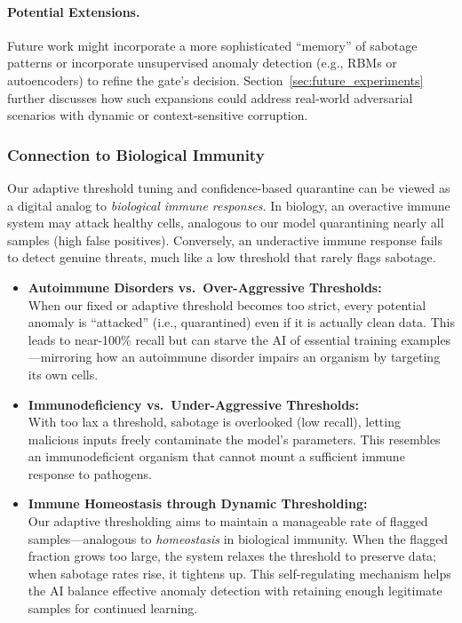 \documentclass[12pt]{article}
\begin{document}
\paragraph{Potential Extensions.}
Future work might incorporate a more sophisticated “memory” of sabotage patterns
or incorporate unsupervised anomaly detection (e.g., RBMs or autoencoders) to refine
the gate’s decision. Section~\ref{sec:future_experiments} further discusses how
such expansions could address real-world adversarial scenarios with dynamic or
context-sensitive corruption.

\subsubsection{Connection to Biological Immunity}
\label{subsubsec:immune_analogy}

Our adaptive threshold tuning and confidence-based quarantine can be viewed
as a digital analog to \emph{biological immune responses}. In biology, an
overactive immune system may attack healthy cells, analogous to our model
quarantining nearly all samples (high false positives). Conversely, an
underactive immune response fails to detect genuine threats, much like
a low threshold that rarely flags sabotage.

\begin{itemize}
    \item \textbf{Autoimmune Disorders vs.\ Over-Aggressive Thresholds:}\\
    When our fixed or adaptive threshold becomes too strict, every potential
    anomaly is “attacked” (i.e., quarantined) even if it is actually clean
    data. This leads to near-100\% recall but can starve the AI of essential
    training examples—mirroring how an autoimmune disorder impairs an organism
    by targeting its own cells.

    \item \textbf{Immunodeficiency vs.\ Under-Aggressive Thresholds:}\\
    With too lax a threshold, sabotage is overlooked (low recall), letting
    malicious inputs freely contaminate the model’s parameters. This resembles
    an immunodeficient organism that cannot mount a sufficient immune response
    to pathogens.

    \item \textbf{Immune Homeostasis through Dynamic Thresholding:}\\
    Our adaptive thresholding aims to maintain a manageable rate of flagged
    samples—analogous to \emph{homeostasis} in biological immunity. When the
    flagged fraction grows too large, the system relaxes the threshold to
    preserve data; when sabotage rates rise, it tightens up. This self-regulating
    mechanism helps the AI balance effective anomaly detection with retaining
    enough legitimate samples for continued learning.
\end{itemize}
\end{document}
